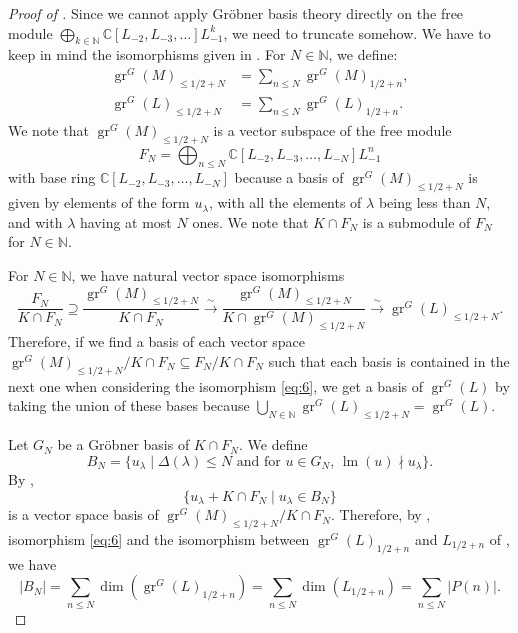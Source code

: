 \documentclass[a4paper, 12pt, reqno]{amsart}
\theoremstyle{remark}
\DeclareMathOperator{\gr}{gr}
\DeclareMathOperator{\lm}{lm}
\begin{document}
\begin{proof}[Proof of ]
  Since we cannot apply Gröbner basis theory directly on the free module $\bigoplus_{k \in \mathbb{N}}\mathbb{C}[L_{-2}, L_{-3}, \dots]L_{-1}^k$, we need to truncate somehow.
  We have to keep in mind the isomorphisms given in .
  For $N \in \mathbb{N}$, we define:
  \begin{align*}
    \gr^G(M)_{\le 1/2 + N} &= \sum_{n \le N}\gr^G(M)_{1/2 + n}, \\
    \gr^G(L)_{\le 1/2 + N} &= \sum_{n \le N}\gr^G(L)_{1/2 + n}.
  \end{align*}
  We note that $\gr^G(M)_{\le 1/2 + N}$ is a vector subspace of the free module
  \begin{equation*}
    F_N = \bigoplus_{n \le N}\mathbb{C}[L_{-2}, L_{-3}, \dots, L_{-N}]L_{-1}^n
  \end{equation*}
  with base ring $\mathbb{C}[L_{-2}, L_{-3}, \dots, L_{-N}]$ because a basis of $\gr^G(M)_{\le 1/2 + N}$ is given by elements of the form $u_{\lambda}$, with all the elements of $\lambda$ being less than $N$, and with $\lambda$ having at most $N$ ones.
  We note that $K \cap F_N$ is a submodule of $F_N$ for $N \in \mathbb{N}$.

  For $N \in \mathbb{N}$, we have natural vector space isomorphisms
  \begin{equation}
    \label{eq:6}
    \frac{F_N}{K \cap F_N} \supseteq \frac{\gr^G(M)_{\le 1/2 + N}}{K \cap F_N} \xrightarrow{\sim} \frac{\gr^G(M)_{\le 1/2 + N}}{K \cap \gr^G(M)_{\le 1/2 + N}} \xrightarrow{\sim} \gr^G(L)_{\le 1/2 + N}.
  \end{equation}
  Therefore, if we find a basis of each vector space $\gr^G(M)_{\le 1/2 + N}/K \cap F_N \subseteq F_N/K \cap F_N$ such that each basis is contained in the next one when considering the isomorphism \eqref{eq:6}, we get a basis of $\gr^G(L)$ by taking the union of these bases because $\bigcup_{N \in \mathbb{N}}\gr^G(L)_{\le 1/2 + N} = \gr^G(L)$.

  Let $G_N$ be a Gröbner basis of $K \cap F_N$.
  We define
  \begin{equation*}
    B_N = \{u_{\lambda} \mid \text{$\Delta(\lambda) \le N$ and for $u \in G_N$, $\lm(u) \nmid u_{\lambda}$}\}.
  \end{equation*}
  By \cite[Proposition 3.6.4]{adams_introduction_1994},
  \begin{equation}
    \label{eq:7}
    \{u_{\lambda} + K \cap F_N \mid u_{\lambda} \in B_N\}
  \end{equation}
  is a vector space basis of $\gr^G(M)_{\le 1/2 + N}/K \cap F_N$.
  Therefore, by , isomorphism \eqref{eq:6} and the isomorphism between $\gr^G(L)_{1/2 + n}$ and $L_{1/2 + n}$ of , we have
  \begin{equation*}
    |B_N| = \sum_{n \le N}\dim(\gr^G(L)_{1/2 + n}) = \sum_{n \le N}\dim(L_{1/2 + n}) = \sum_{n \le N}|P(n)|.
  \end{equation*}


\end{proof}
\end{document}
